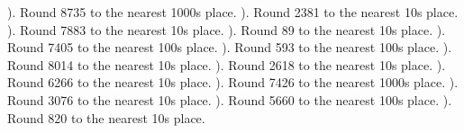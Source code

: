 \documentclass{article}%
\begin{document}
\newline%
). Round 8735 to the nearest 1000s place.%
\newline%
\newline%
). Round 2381 to the nearest 10s place.%
\newline%
\newline%
). Round 7883 to the nearest 10s place.%
\newline%
\newline%
). Round 89 to the nearest 10s place.%
\newline%
\newline%
). Round 7405 to the nearest 100s place.%
\newline%
\newline%
). Round 593 to the nearest 100s place.%
\newline%
\newline%
). Round 8014 to the nearest 10s place.%
\newline%
\newline%
). Round 2618 to the nearest 10s place.%
\newline%
\newline%
). Round 6266 to the nearest 10s place.%
\newline%
\newline%
). Round 7426 to the nearest 1000s place.%
\newline%
\newline%
). Round 3076 to the nearest 10s place.%
\newline%
\newline%
). Round 5660 to the nearest 100s place.%
\newline%
\newline%
). Round 820 to the nearest 10s place.%
\newline%
\newline%
\newline%
\end{document}
